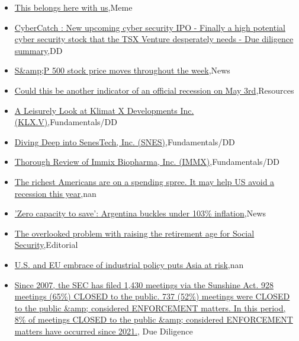 \documentclass{article}%
\begin{document}
%
\begin{itemize}%
\item%
\href{https://reddit.com/r/wallstreetbets/comments/12mtzxv/this\_belongs\_here\_with\_us/}{This belongs here with us},Meme%
\item%
\href{https://reddit.com/r/Baystreetbets/comments/12mciss/cybercatch\_new\_upcoming\_cyber\_security\_ipo/}{CyberCatch : New upcoming cyber security IPO - Finally a high potential cyber security stock that the TSX Venture desperately needs - Due diligence summary},DD%
\item%
\href{https://reddit.com/r/StockMarket/comments/12mfnt8/sp\_500\_stock\_price\_moves\_throughout\_the\_week/}{S\&amp;P 500 stock price moves throughout the week},News%
\item%
\href{https://reddit.com/r/StockMarket/comments/12me63g/could\_this\_be\_another\_indicator\_of\_an\_official/}{Could this be another indicator of an official recession on May 3rd},Resources%
\item%
\href{https://reddit.com/r/StockMarket/comments/12mdfjv/a\_leisurely\_look\_at\_klimat\_x\_developments\_inc\_klxv/}{A Leisurely Look at Klimat X Developments Inc. (KLX.V)},Fundamentals/DD%
\item%
\href{https://reddit.com/r/StockMarket/comments/12md3zo/diving\_deep\_into\_senestech\_inc\_snes/}{Diving Deep into SenesTech, Inc. (SNES)},Fundamentals/DD%
\item%
\href{https://reddit.com/r/StockMarket/comments/12mcwr6/thorough\_review\_of\_immix\_biopharma\_inc\_immx/}{Thorough Review of Immix Biopharma, Inc. (IMMX)},Fundamentals/DD%
\item%
\href{https://reddit.com/r/Economics/comments/12mwkf1/the\_richest\_americans\_are\_on\_a\_spending\_spree\_it/}{The richest Americans are on a spending spree. It may help US avoid a recession this year},nan%
\item%
\href{https://reddit.com/r/Economics/comments/12mrgp7/zero\_capacity\_to\_save\_argentina\_buckles\_under\_103/}{'Zero capacity to save': Argentina buckles under 103\% inflation},News%
\item%
\href{https://reddit.com/r/Economics/comments/12mgun9/the\_overlooked\_problem\_with\_raising\_the/}{The overlooked problem with raising the retirement age for Social Security},Editorial%
\item%
\href{https://reddit.com/r/Economics/comments/12mduiu/us\_and\_eu\_embrace\_of\_industrial\_policy\_puts\_asia/}{U.S. and EU embrace of industrial policy puts Asia at risk},nan%
\item%
\href{https://reddit.com/r/Superstonk/comments/12mptv0/since\_2007\_the\_sec\_has\_filed\_1430\_meetings\_via/}{Since 2007, the SEC has filed 1,430 meetings via the Sunshine Act. 928 meetings (65\%) CLOSED to the public. 737 (52\%) meetings were CLOSED to the public \&amp; considered ENFORCEMENT matters. In this period, 8\% of meetings CLOSED to the public \&amp; considered ENFORCEMENT matters have occurred since 2021.}, Due Diligence%
\end{itemize}%
\end{document}
